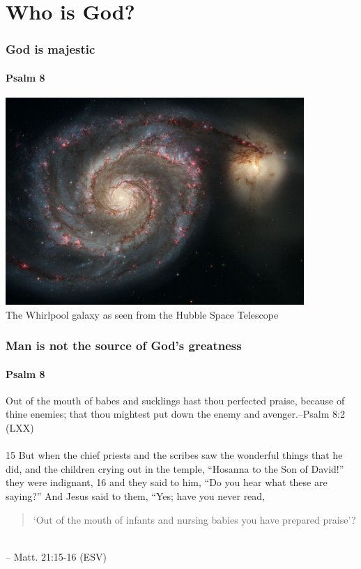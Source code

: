 \section{Who is God?}

\begin{frame}
\frametitle{God is majestic}
\framesubtitle{Psalm 8}
\begin{center}
	\includegraphics[width=0.85\textwidth]{figures/galaxy.jpg}\\
	{\footnotesize The Whirlpool galaxy as seen from the Hubble Space Telescope}
\end{center}

\end{frame}

\begin{frame}
\frametitle{Man is not the source of God's greatness}
\framesubtitle{Psalm 8}
Out of the mouth of babes and sucklings hast thou perfected praise, because of thine enemies; that thou mightest put down the enemy and avenger.\hfill--Psalm 8:2 (LXX)\\~\\
15 But when the chief priests and the scribes saw the wonderful things that he did, and the children crying out in the temple, ``Hosanna to the Son of David!'' they were indignant, 16 and they said to him, ``Do you hear what these are saying?'' And Jesus said to them, ``Yes; have you never read,
\begin{quote}
`Out of the mouth of infants and nursing babies you have prepared praise'?
\end{quote}\\
\hfill-- Matt. 21:15-16 (ESV)
\normalsize

\end{frame}

